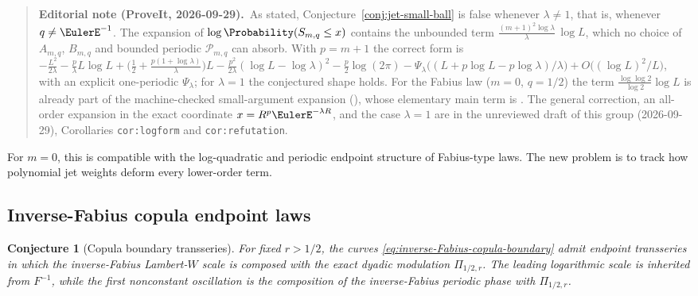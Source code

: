 \documentclass[11pt,a4paper]{article}
\newtheorem{conjecture}[theorem]{Conjecture}
\theoremstyle{definition}
\theoremstyle{remark}
\begin{document}
\begin{quote}\small\raggedright
\textbf{Editorial note (ProveIt, 2026-09-29).}\ 
As stated, Conjecture~\ref{conj:jet-small-ball} is false whenever
$\lambda\ne1$, that is, whenever $q\ne\EulerE^{-1}$.  The expansion of
$\log\Probability(S_{m,q}\le x)$ contains the unbounded term
$\frac{(m+1)^2\log\lambda}{\lambda}\,\log L$, which no choice of
$A_{m,q}$, $B_{m,q}$ and bounded periodic $\mathcal P_{m,q}$ can absorb.
With $p=m+1$ the correct form is
$-\frac{L^2}{2\lambda}-\frac p\lambda L\log L
+\bigl(\frac12+\frac{p(1+\log\lambda)}{\lambda}\bigr)L
-\frac{p^2}{2\lambda}(\log L-\log\lambda)^2-\frac p2\log(2\pi)
-\Psi_\lambda\bigl((L+p\log L-p\log\lambda)/\lambda\bigr)
+O\bigl((\log L)^2/L\bigr)$, with an explicit one-periodic $\Psi_\lambda$;
for $\lambda=1$ the conjectured shape holds.  For the Fabius law
($m=0$, $q=1/2$) the term $\frac{\log\log2}{\log2}\log L$ is already
part of the machine-checked small-argument expansion
(),
whose elementary main term is
.  The general correction, an
all-order expansion in the exact coordinate $x=R^{p}\EulerE^{-\lambda R}$,
and the case $\lambda=1$ are in the unreviewed draft
 of this
group (2026-09-29), Corollaries \texttt{cor:logform} and
\texttt{cor:refutation}.
\end{quote}

For $m=0$, this is compatible with the log-quadratic and periodic endpoint structure of Fabius-type laws.  The new problem is to track how polynomial jet weights deform every lower-order term.

\subsection{Inverse-Fabius copula endpoint laws}

\begin{conjecture}[Copula boundary transseries]
\label{conj:copula-endpoints}
For fixed $r>1/2$, the curves \eqref{eq:inverse-Fabius-copula-boundary} admit endpoint transseries in which the inverse-Fabius Lambert-$W$ scale is composed with the exact dyadic modulation $\Pi_{1/2,r}$.  The leading logarithmic scale is inherited from $F^{-1}$, while the first nonconstant oscillation is the composition of the inverse-Fabius periodic phase with $\Pi_{1/2,r}$.
\end{conjecture}
\end{document}
